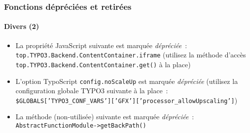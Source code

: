 \begin{frame}[fragile]
	\frametitle{Fonctions dépréciées et retirées}
	\framesubtitle{Divers (2)}


	\begin{itemize}

		\item La propriété JavaScript suivante est marquée \textit{dépréciée}~:\newline
			\texttt{top.TYPO3.Backend.ContentContainer.iframe}\newline
			\smaller
				(utilisez la méthode d'accès \texttt{top.TYPO3.Backend.ContentContainer.get()} à la place)
			\normalsize

		\item L'option TypoScript \texttt{config.noScaleUp} est marquée \textit{dépréciée}\newline
			\smaller
				(utilisez la configuration globale TYPO3 suivante à la place~:\newline
				\texttt{\$GLOBALS['TYPO3\_CONF\_VARS']['GFX']['processor\_allowUpscaling']})
			\normalsize

		\item La méthode (non-utilisée) suivante est marquée \textit{dépréciée}~:\newline
			\texttt{AbstractFunctionModule->getBackPath()}

	\end{itemize}

\end{frame}






